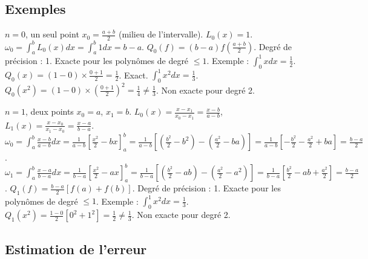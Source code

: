 \documentclass[oneside]{book}
\begin{document}
\subsection{Exemples}

\begin{example}
$n = 0$, un seul point $x_0 = \frac{a+b}{2}$ (milieu de l'intervalle).
$L_0(x) = 1$. $\omega_0 = \int_{a}^{b} L_0(x) dx = \int_{a}^{b} 1 dx = b - a$.
$Q_0(f) = (b - a) f\left(\frac{a+b}{2}\right)$.
Degré de précision : 1. Exacte pour les polynômes de degré $\leq 1$.
Exemple : $\int_{0}^{1} x dx = \frac{1}{2}$. $Q_0(x) = (1-0) \times \frac{0+1}{2} = \frac{1}{2}$. Exact.
$\int_{0}^{1} x^2 dx = \frac{1}{3}$. $Q_0(x^2) = (1-0) \times \left(\frac{0+1}{2}\right)^2 = \frac{1}{4} \neq \frac{1}{3}$. Non exacte pour degré 2.

\end{example}

\begin{example}
$n = 1$, deux points $x_0 = a$, $x_1 = b$.
$L_0(x) = \frac{x - x_1}{x_0 - x_1} = \frac{x - b}{a - b}$, $L_1(x) = \frac{x - x_0}{x_1 - x_0} = \frac{x - a}{b - a}$.
$\omega_0 = \int_{a}^{b} \frac{x - b}{a - b} dx = \frac{1}{a - b} \left[\frac{x^2}{2} - bx\right]_{a}^{b} = \frac{1}{a - b} \left[ \left(\frac{b^2}{2} - b^2\right) - \left(\frac{a^2}{2} - ba\right) \right] = \frac{1}{a - b} \left[ -\frac{b^2}{2} - \frac{a^2}{2} + ba \right] = \frac{b - a}{2}$.
$\omega_1 = \int_{a}^{b} \frac{x - a}{b - a} dx = \frac{1}{b - a} \left[\frac{x^2}{2} - ax\right]_{a}^{b} = \frac{1}{b - a} \left[ \left(\frac{b^2}{2} - ab\right) - \left(\frac{a^2}{2} - a^2\right) \right] = \frac{1}{b - a} \left[ \frac{b^2}{2} - ab + \frac{a^2}{2} \right] = \frac{b - a}{2}$.
$Q_1(f) = \frac{b - a}{2} [f(a) + f(b)]$.
Degré de précision : 1. Exacte pour les polynômes de degré $\leq 1$.
Exemple : $\int_{0}^{1} x^2 dx = \frac{1}{3}$. $Q_1(x^2) = \frac{1 - 0}{2} [0^2 + 1^2] = \frac{1}{2} \neq \frac{1}{3}$. Non exacte pour degré 2.
\end{example}

\subsection{Estimation de l'erreur}
\end{document}
